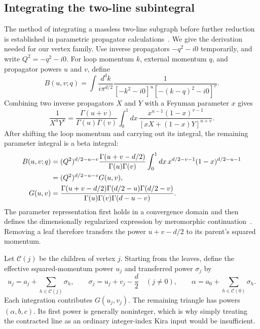 \subsection{Integrating the two-line subintegral}
The method of integrating a massless two-line subgraph before further reduction is established in parametric propagator calculations~\cite{Ruijl2017Forcer}. We give the derivation needed for our vertex family. Use inverse propagators $-q^2-i0$ temporarily, and write $Q^2=-q^2-i0$. For loop momentum $k$, external momentum $q$, and propagator powers $u$ and $v$, define
\begin{equation}
 B(u,v;q)=\int\frac{d^d k}{i\pi^{d/2}}
 \frac{1}{[-k^2-i0]^u[-(k-q)^2-i0]^v}.
 \label{eq:loop-tree-Bdef}
\end{equation}
Combining two inverse propagators $X$ and $Y$ with a Feynman parameter $x$ gives~\cite{Weinzierl2022}
\begin{equation}
 \frac{1}{X^uY^v}=\frac{\Gamma(u+v)}{\Gamma(u)\Gamma(v)}
 \int_0^1 dx\,\frac{x^{u-1}(1-x)^{v-1}}
 {[xX+(1-x)Y]^{u+v}}.
 \label{eq:loop-tree-param}
\end{equation}
After shifting the loop momentum and carrying out its integral, the remaining parameter integral is a beta integral:
\begin{align}
 B(u,v;q)&=(Q^2)^{d/2-u-v}
 \frac{\Gamma(u+v-d/2)}{\Gamma(u)\Gamma(v)}
 \int_0^1 dx\,x^{d/2-v-1}(1-x)^{d/2-u-1}\notag\\
 &=(Q^2)^{d/2-u-v}G(u,v),\label{eq:loop-tree-bubble}\\
 G(u,v)&=\frac{\Gamma(u+v-d/2)\Gamma(d/2-u)\Gamma(d/2-v)}
 {\Gamma(u)\Gamma(v)\Gamma(d-u-v)}.\label{eq:loop-tree-G}
\end{align}
The parameter representation first holds in a convergence domain and then defines the dimensionally regularized expression by meromorphic continuation~\cite{Weinzierl2022}. Removing a leaf therefore transfers the power $u+v-d/2$ to its parent's squared momentum.

Let $\mathcal C(j)$ be the children of vertex $j$. Starting from the leaves, define the effective squared-momentum power $u_j$ and transferred power $\sigma_j$ by
\begin{equation}
 u_j=a_j+\sum_{h\in\mathcal C(j)}\sigma_h,
 \qquad \sigma_j=u_j+v_j-\frac d2\quad(j\ne0),
 \qquad \alpha=a_0+\sum_{h\in\mathcal C(0)}\sigma_h.
 \label{eq:loop-tree-transfer}
\end{equation}
Each integration contributes $G(u_j,v_j)$. The remaining triangle has powers $(\alpha,b,c)$. Its first power is generally noninteger, which is why simply treating the contracted line as an ordinary integer-index Kira input would be insufficient.

